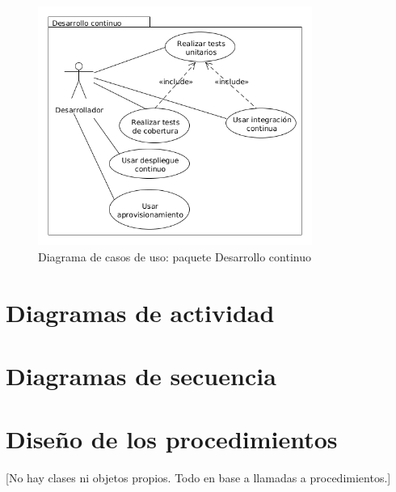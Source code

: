 \begin{figure}[!h]
  \begin{center}
  \includegraphics[width=0.8\textwidth]{imagenes/diagrama_casos_uso_desarrollo_continuo.png}
  \caption[Casos de uso]{Diagrama de casos de uso: paquete Desarrollo continuo}
  \label{fig:casos_uso_dc}
  \end{center}
\end{figure}

\newpage
\section{Diagramas de actividad}

\section{Diagramas de secuencia}

\section{Diseño de los procedimientos}

[No hay clases ni objetos propios. Todo en base a llamadas a procedimientos.]